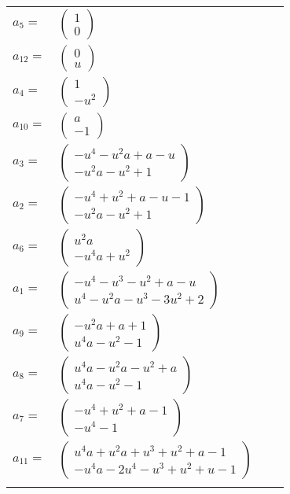 \documentclass[1p]{elsarticle_modified}
\theoremstyle{definition}
\begin{document}
\begin{tabular}{m{7pt} m{180pt} m{7pt} m{180pt} }
\flushright $a_{5}=$&$\begin{pmatrix}1\\0\end{pmatrix}$ \\
\flushright $a_{12}=$&$\begin{pmatrix}0\\u\end{pmatrix}$ \\
\flushright $a_{4}=$&$\begin{pmatrix}1\\- u^2\end{pmatrix}$ \\
\flushright $a_{10}=$&$\begin{pmatrix}a\\-1\end{pmatrix}$ \\
\flushright $a_{3}=$&$\begin{pmatrix}- u^4- u^2 a+a- u\\- u^2 a- u^2+1\end{pmatrix}$ \\
\flushright $a_{2}=$&$\begin{pmatrix}- u^4+u^2+a- u-1\\- u^2 a- u^2+1\end{pmatrix}$ \\
\flushright $a_{6}=$&$\begin{pmatrix}u^2 a\\- u^4 a+u^2\end{pmatrix}$ \\
\flushright $a_{1}=$&$\begin{pmatrix}- u^4- u^3- u^2+a- u\\u^4- u^2 a- u^3-3 u^2+2\end{pmatrix}$ \\
\flushright $a_{9}=$&$\begin{pmatrix}- u^2 a+a+1\\u^4 a- u^2-1\end{pmatrix}$ \\
\flushright $a_{8}=$&$\begin{pmatrix}u^4 a- u^2 a- u^2+a\\u^4 a- u^2-1\end{pmatrix}$ \\
\flushright $a_{7}=$&$\begin{pmatrix}- u^4+u^2+a-1\\- u^4-1\end{pmatrix}$ \\
\flushright $a_{11}=$&$\begin{pmatrix}u^4 a+u^2 a+u^3+u^2+a-1\\- u^4 a-2 u^4- u^3+u^2+u-1\end{pmatrix}$\\&\end{tabular}
\end{document}
